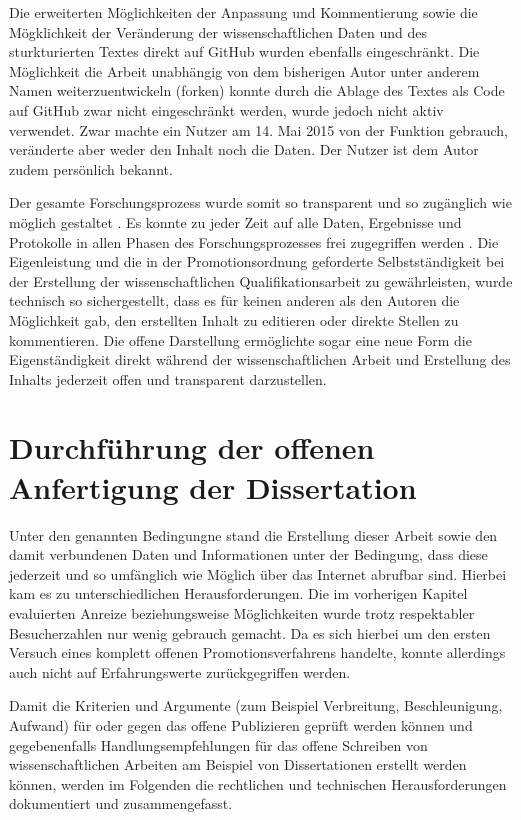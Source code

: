 Die erweiterten Möglichkeiten der Anpassung und Kommentierung sowie die Mögklichkeit der Veränderung der wissenschaftlichen Daten und des sturkturierten Textes direkt auf GitHub wurden ebenfalls eingeschränkt. Die Möglichkeit die Arbeit unabhängig von dem bisherigen Autor unter anderem Namen weiterzuentwickeln (forken) konnte durch die Ablage des Textes als Code auf GitHub zwar nicht eingeschränkt werden, wurde jedoch nicht aktiv verwendet. Zwar machte ein Nutzer am 14. Mai 2015 von der Funktion gebrauch, veränderte aber weder den Inhalt noch die Daten. Der Nutzer ist dem Autor zudem persönlich bekannt.

Der gesamte Forschungsprozess wurde somit so transparent und so zugänglich wie möglich gestaltet \cite{Scheliga_2014}. Es konnte zu jeder Zeit auf alle Daten, Ergebnisse und Protokolle in allen Phasen des Forschungsprozesses frei zugegriffen werden \cite{RIN_2010_open_research}. Die Eigenleistung und die in der Promotionsordnung geforderte \cite{promotionsordnung_leuphana_kuwi_2011} Selbstständigkeit bei der Erstellung der wissenschaftlichen Qualifikationsarbeit zu gewährleisten, wurde technisch so sichergestellt, dass es für keinen anderen als den Autoren die Möglichkeit gab, den erstellten Inhalt zu editieren oder direkte Stellen zu kommentieren. Die offene Darstellung ermöglichte sogar eine neue Form die Eigenständigkeit direkt während der wissenschaftlichen Arbeit und Erstellung des Inhalts jederzeit offen und transparent darzustellen.

\section{Durchführung der offenen Anfertigung der Dissertation}

Unter den genannten Bedingungne stand die Erstellung dieser Arbeit sowie den damit verbundenen Daten und Informationen unter der Bedingung, dass diese jederzeit und so umfänglich wie Möglich über das Internet abrufbar sind. Hierbei kam es zu unterschiedlichen Herausforderungen. Die im vorherigen Kapitel evaluierten Anreize beziehungsweise Möglichkeiten wurde trotz respektabler Besucherzahlen nur wenig gebrauch gemacht. Da es sich hierbei um den ersten Versuch eines komplett offenen Promotionsverfahrens handelte, konnte allerdings auch nicht auf Erfahrungswerte zurückgegriffen werden.

Damit die Kriterien und Argumente (zum Beispiel Verbreitung, Beschleunigung, Aufwand) für oder gegen das offene Publizieren geprüft werden können und gegebenenfalls Handlungsempfehlungen für das offene Schreiben von wissenschaftlichen Arbeiten am Beispiel von Dissertationen erstellt werden können, werden im Folgenden die rechtlichen und technischen Herausforderungen dokumentiert und zusammengefasst.

